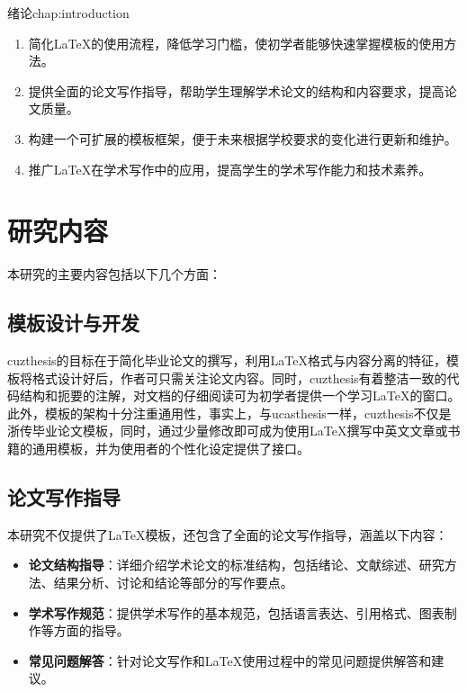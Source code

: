\begin{cuzchapter}{绪论}{chap:introduction}
\begin{enumerate}
		\item 简化\LaTeX{}的使用流程，降低学习门槛，使初学者能够快速掌握模板的使用方法。

		\item 提供全面的论文写作指导，帮助学生理解学术论文的结构和内容要求，提高论文质量。

		\item 构建一个可扩展的模板框架，便于未来根据学校要求的变化进行更新和维护。

		\item 推广\LaTeX{}在学术写作中的应用，提高学生的学术写作能力和技术素养。
	\end{enumerate}

	\section{研究内容}\label{sec:content}

	本研究的主要内容包括以下几个方面：

	\subsection{模板设计与开发}

	cuzthesis的目标在于简化毕业论文的撰写，利用\LaTeX{}格式与内容分离的特征，模板将格式设计好后，作者可只需关注论文内容。同时，cuzthesis有着整洁一致的代码结构和扼要的注解，对文档的仔细阅读可为初学者提供一个学习\LaTeX{}的窗口。此外，模板的架构十分注重通用性，事实上，与ucasthesis一样，cuzthesis不仅是浙传毕业论文模板，同时，通过少量修改即可成为使用\LaTeX{}撰写中英文文章或书籍的通用模板，并为使用者的个性化设定提供了接口。

	\subsection{论文写作指导}

	本研究不仅提供了\LaTeX{}模板，还包含了全面的论文写作指导，涵盖以下内容：

	\begin{itemize}
		\item \textbf{论文结构指导}：详细介绍学术论文的标准结构，包括绪论、文献综述、研究方法、结果分析、讨论和结论等部分的写作要点。

		\item \textbf{学术写作规范}：提供学术写作的基本规范，包括语言表达、引用格式、图表制作等方面的指导。

		\item \textbf{常见问题解答}：针对论文写作和\LaTeX{}使用过程中的常见问题提供解答和建议。
	\end{itemize}


\end{cuzchapter}
